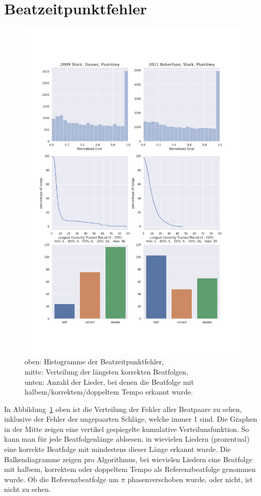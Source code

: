 \section{Beatzeitpunktfehler}
{
	\begin{figure}[h]
		\includegraphics[scale=0.5]{resources/beat_positions.png}
		\caption{
			oben: Histogramme der Beatzeitpunktfehler, \\
			mitte: Verteilung der längsten korrekten Beatfolgen, \\
			unten: Anzahl der Lieder, bei denen die Beatfolge mit halbem/korrektem/doppeltem Tempo erkannt wurde.
		}
		\label{fig:beaterror}
	\end{figure}

	In Abbildung~\ref{fig:beaterror} oben ist die Verteilung der Fehler aller Beatpaare zu sehen,
		inklusive der Fehler der ungepaarten Schläge,
		welche immer \num{1} sind.
	Die Graphen in der Mitte zeigen eine vertikel gespiegelte kumulative Verteilunsfunktion.
	So kann man für jede Beatfolgenlänge ablsesen,
		in wievielen Liedern (prozentual) eine korrekte Beatfolge mit mindestens dieser Länge erkannt wurde.
	Die Balkendiagramme zeigen pro Algorithmus,
		bei wievielen Liedern eine Beatfolge mit halbem, korrektem oder doppeltem Tempo als Referenzbeatfolge genommen wurde.
	Ob die Referenzbeatfolge um $\pi$ phasenverschoben wurde, oder nicht, ist nicht zu sehen.
}

